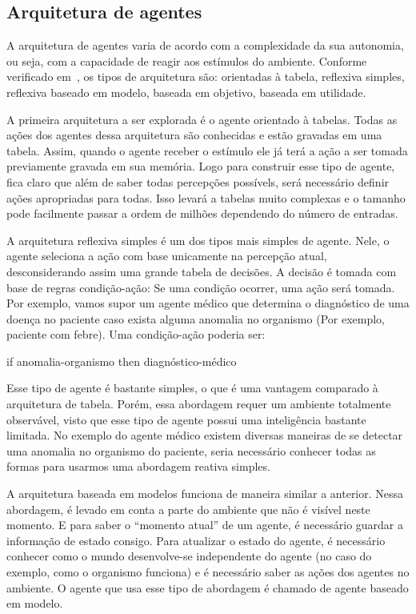 \subsection{Arquitetura de agentes}

A arquitetura de agentes varia de acordo com a complexidade da sua autonomia, ou seja, com a capacidade de reagir aos estímulos do ambiente. Conforme verificado em~\cite{novig95}, os tipos de arquitetura são: orientadas à tabela, reflexiva simples, reflexiva baseado em modelo, baseada em objetivo, baseada em utilidade.

A primeira arquitetura a ser explorada é o agente orientado à tabelas. Todas as ações dos agentes dessa arquitetura são conhecidas e estão gravadas em uma tabela. Assim, quando o agente receber o estímulo ele já terá a ação a ser tomada previamente gravada em sua memória. Logo para construir esse tipo de agente, fica claro que além de saber todas percepções possívels, será necessário definir ações apropriadas para todas. Isso levará a tabelas muito complexas e o tamanho pode facilmente passar a ordem de milhões dependendo do número de entradas.

A arquitetura reflexiva simples é um dos tipos mais simples de agente. Nele, o agente seleciona a ação com base unicamente na percepção atual, desconsiderando assim uma grande tabela de decisões. A decisão é tomada com base de regras condição-ação: Se uma condição ocorrer, uma ação será tomada. Por exemplo, vamos supor um agente médico que determina o diagnóstico de uma doença no paciente caso exista alguma anomalia no organismo (Por exemplo, paciente com febre). Uma condição-ação poderia ser:

if anomalia-organismo then diagnóstico-médico

Esse tipo de agente é bastante simples, o que é uma vantagem comparado à arquitetura de tabela. Porém, essa abordagem requer um ambiente totalmente observável, visto que esse tipo de agente possui uma inteligência bastante limitada. No exemplo do agente médico existem diversas maneiras de se detectar uma anomalia no organismo do paciente, seria necessário conhecer todas as formas para usarmos uma abordagem reativa simples.

A arquitetura baseada em modelos funciona de maneira similar a anterior. Nessa abordagem, é levado em conta a parte do ambiente que não é visível neste momento. E para saber o ``momento atual'' de um agente, é necessário guardar a informação de estado consigo. Para atualizar o estado do agente, é necessário conhecer como o mundo desenvolve-se independente do agente (no caso do exemplo, como o organismo funciona) e é necessário saber as ações dos agentes no ambiente. O agente que usa esse tipo de abordagem é chamado de agente baseado em modelo.

